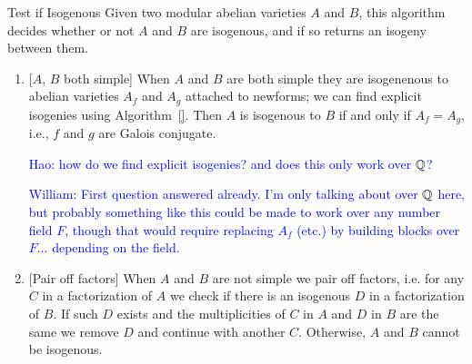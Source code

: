 \documentclass{article}
\newcommand{\Hao}[1]{\textcolor{blue}{\textsf{Hao: #1}}}
\newcommand{\wstein}[1]{\textcolor{blue}{\textsf{William: #1}}}
\begin{document}
\begin{algorithm}{Test if Isogenous}
    Given two modular abelian varieties $A$ and $B$, this
    algorithm decides whether or not $A$ and $B$ are isogenous, and if
    so returns an isogeny between them.

\begin{enumerate}
\item{} [$A$, $B$ both simple] When $A$ and $B$ are both simple they
  are isogenenous to abelian varieties $A_f$ and $A_g$ attached to
  newforms; we can find explicit isogenies using Algorithm~\ref{}.
  Then $A$ is isogenous to $B$ if and only if $A_f = A_g$, i.e., $f$
  and $g$ are Galois conjugate.

\Hao{how do we find explicit isogenies? and does this only work over $\mathbb{Q}$?}

\wstein{First question answered already.  I'm only talking about over
$\mathbb{Q}$ here, but probably something like this could be made to work
over any number field $F$, though that would require replacing
$A_f$ (etc.) by building blocks over $F$... depending on the field.}


\item{} [Pair off factors] When $A$ and $B$ are not simple we pair off
  factors, i.e. for any $C$ in a factorization of $A$ we check if
  there is an isogenous $D$ in a factorization of $B$. If such $D$
  exists and the multiplicities of $C$ in $ A$ and $D$ in $B$ are the
  same we remove $D$ and continue with another $C$. Otherwise, $A$ and
  $B$ cannot be isogenous.
\end{enumerate}
\end{algorithm}
\end{document}
